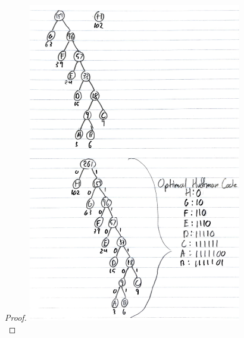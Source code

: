 \documentclass[11pt]{article}
\theoremstyle{definition}
\theoremstyle{definition}
\theoremstyle{definition}
\begin{document}
\begin{proof}
\includegraphics[width=0.7\textwidth]{Huff2_Hw3_CSCI3104.pdf}\\


\end{proof}



\end{document}
